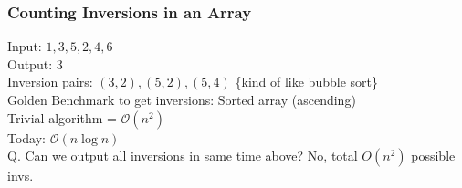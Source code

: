 \documentclass[a4paper
]{article}
\begin{document}
\hypertarget{counting-inversions-in-an-array}{%
\subsubsection{Counting Inversions in an
Array}\label{counting-inversions-in-an-array}}

Input: {\(1,3,5,2,4,6\)}\\
Output: {\(3\)}\\
Inversion pairs: {\((3,2),(5,2),(5,4)\)} \{kind of like bubble sort\}\\
Golden Benchmark to get inversions: Sorted array (ascending)\\
Trivial algorithm = {\(\mathcal{O}(n^{2})\)}\\
Today: {\(\mathcal{O}(n\log n)\)}\\
Q. Can we output all inversions in same time above? No, total
{\(O(n^{2})\)} possible invs.
\end{document}
